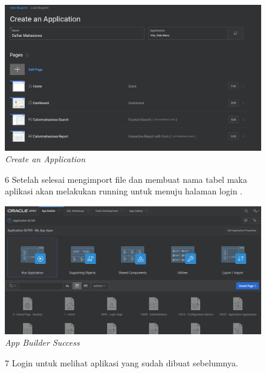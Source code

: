 \begin{enumerate}
\begin{figure}
    \begin{center}
\includegraphics[scale=0.4]{figures/daftarmhs.png}
    \caption{\textit{Create an Application}}
        \end{center}
\label{gambar}
\end{figure}

\begin{figure}

\item[6]Setelah selesai mengimport file dan membuat nama tabel maka aplikasi akan melakukan running untuk menuju halaman login .

    \begin{center}
\includegraphics[scale=0.4]{figures/tampilaApp.png}
    \caption{\textit{App Builder Success}}
        \end{center}
\label{gambar}
\end{figure}

\begin{figure}
\item[7]Login untuk melihat aplikasi yang sudah dibuat sebelumnya.


\end{figure}
\end{enumerate}
